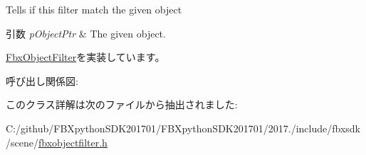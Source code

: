 Tells if this filter match the given object 
\begin{DoxyParams}{引数}
{\em p\+Object\+Ptr} & The given object. \\
\hline
\end{DoxyParams}


\hyperlink{class_fbx_object_filter_a49cc7b7c109f98910241d62ec0bd093b}{Fbx\+Object\+Filter}を実装しています。

呼び出し関係図\+:


このクラス詳解は次のファイルから抽出されました\+:\begin{DoxyCompactItemize}
\item 
C\+:/github/\+F\+B\+Xpython\+S\+D\+K201701/\+F\+B\+Xpython\+S\+D\+K201701/2017./include/fbxsdk/scene/\hyperlink{fbxobjectfilter_8h}{fbxobjectfilter.\+h}\end{DoxyCompactItemize}
